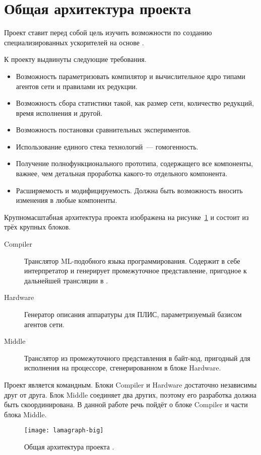 
\section{Общая архитектура проекта}
\label{sec:big-arch}

Проект \Lamagraph{} ставит перед собой цель изучить возможности по созданию специализированных ускорителей на основе \INs{}.

К проекту выдвинуты следующие требования.
\begin{itemize}
    \item Возможность параметризовать компилятор и вычислительное ядро типами агентов сети и правилами их редукции.
    \item Возможность сбора статистики такой, как размер сети, количество редукций, время исполнения и другой.
    \item Возможность постановки сравнительных экспериментов.
    \item Использование единого стека технологий~--- гомогенность.
    \item Получение полнофункционального прототипа, содержащего все компоненты, важнее, чем детальная проработка какого-то отдельного компонента.
    \item Расширяемость и модифицируемость.
          Должна быть возможность вносить изменения в любые компоненты.
\end{itemize}


Крупномасштабная архитектура проекта изображена на рисунке~\ref{fig:lamagraph-big} и состоит из трёх крупных блоков.
\begin{description}
    \item[Compiler] Транслятор ML-подобного языка программирования.
          Содержит в себе интерпретатор и генерирует промежуточное представление, пригодное к дальнейшей трансляции в \INs{}.
    \item[Hardware] Генератор описания аппаратуры для ПЛИС, параметризуемый базисом агентов сети.
    \item[Middle] Транслятор из промежуточного представления в байт-код, пригодный для исполнения на процессоре, сгенерированном в блоке Hardware.
\end{description}


Проект является командным.
Блоки Compiler и Hardware достаточно независимы друг от друга.
Блок Middle соединяет два других, поэтому его разработка должна быть скоординирована.
В данной работе речь пойдёт о блоке Compiler и части блока Middle.

\begin{figure}
    \begin{center}
        \texttt{[image: lamagraph-big]}
    \end{center}
    \caption{Общая архитектура проекта \Lamagraph{}.}
    \label{fig:lamagraph-big}
\end{figure}

